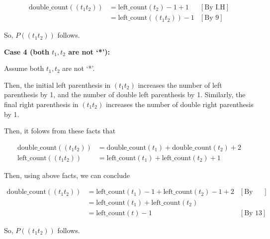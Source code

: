 \documentclass[12pt]{article}
\begin{document}
\begin{enumerate}[a.]
\begin{mdframed}
        \begin{align}
            \text{double\_count}((t_1t_2)) &= \text{left\_count}(t_2) - 1 + 1 & [\text{By I.H}]\\
            &= \text{left\_count}((t_1t_2)) - 1 & [\text{By 9}]
        \end{align}

        \bigskip

        So, $P((t_1t_2))$ follows.

        \bigskip

        \textbf{Case 4 (both $t_1,t_2$ are not `*'):}

        \bigskip

        Assume both $t_1,t_2$ are not `*'.

        \bigskip

        \color{red}Then, the initial left parenthesis in $(t_1t_2)$ increases
        the number of left parenthesis by 1, and the number of double left parenthesis
        by 1. Similarly, the final right parenthesis in $(t_1t_2)$ increases
        the number of double right parenthesis by 1.

        \bigskip

        Then, it folows from these facts that
        \color{black}

        \begin{align}
            \text{double\_count}((t_1t_2)) &= \text{double\_count}(t_1) + \text{double\_count}(t_2) + 2\\
            \text{left\_count}((t_1t_2)) &= \text{left\_count}(t_1) + \text{left\_count}(t_2) + 1
        \end{align}

        \bigskip

        Then, using above facts, we can conclude

        \begin{align}
            \text{double\_count}((t_1t_2)) &= \text{left\_count}(t_1) - 1 + \text{left\_count}(t_2) - 1 + 2 & [\text{By I.H}]\\
            &= \text{left\_count}(t_1) + \text{left\_count}(t_2)\\
            &= \text{left\_count}(t) - 1 & [\text{By 13}]
        \end{align}

        \bigskip

        So, $P((t_1t_2))$ follows.

        \bigskip

    \end{mdframed}


\end{enumerate}
\end{document}
